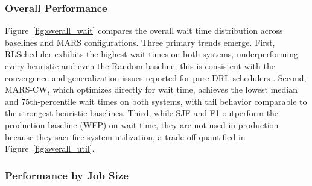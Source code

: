 \documentclass[conference]{IEEEtran}
\begin{document}
\subsubsection{Overall Performance}
Figure~\ref{fig:overall_wait} compares the overall wait time distribution across baselines and MARS configurations. Three primary trends emerge. First, RLScheduler exhibits the highest wait times on both systems, underperforming every heuristic and even the Random baseline; this is consistent with the convergence and generalization issues reported for pure DRL schedulers \cite{zhang_rlscheduler_2020}. Second, MARS-CW, which optimizes directly for wait time, achieves the lowest median and 75th-percentile wait times on both systems, with tail behavior comparable to the strongest heuristic baselines. Third, while SJF and F1 outperform the production baseline (WFP) on wait time, they are not used in production because they sacrifice system utilization, a trade-off quantified in Figure~\ref{fig:overall_util}.


\subsubsection{Performance by Job Size}
\label{sec:results-jobsize}
\end{document}
